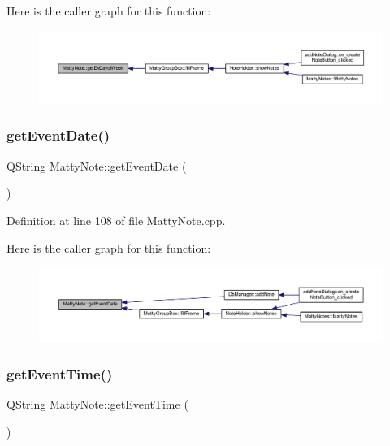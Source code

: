 Here is the caller graph for this function\+:
\nopagebreak
\begin{figure}[H]
\begin{center}
\leavevmode
\includegraphics[width=350pt]{classMattyNote_ac6f675c525f027536fdcfda43f0a261e_icgraph}
\end{center}
\end{figure}
\hypertarget{classMattyNote_a8973578029ab29593061cca235ae84f9}{}\label{classMattyNote_a8973578029ab29593061cca235ae84f9} 
\subsubsection{\texorpdfstring{get\+Event\+Date()}{getEventDate()}}
{\footnotesize\ttfamily Q\+String Matty\+Note\+::get\+Event\+Date (\begin{DoxyParamCaption}{ }\end{DoxyParamCaption})}



Definition at line 108 of file Matty\+Note.\+cpp.

Here is the caller graph for this function\+:
\nopagebreak
\begin{figure}[H]
\begin{center}
\leavevmode
\includegraphics[width=350pt]{classMattyNote_a8973578029ab29593061cca235ae84f9_icgraph}
\end{center}
\end{figure}
\hypertarget{classMattyNote_a8c7f06ff44ce23f5a9ce6d2364732a24}{}\label{classMattyNote_a8c7f06ff44ce23f5a9ce6d2364732a24} 
\subsubsection{\texorpdfstring{get\+Event\+Time()}{getEventTime()}}
{\footnotesize\ttfamily Q\+String Matty\+Note\+::get\+Event\+Time (\begin{DoxyParamCaption}{ }\end{DoxyParamCaption})}




